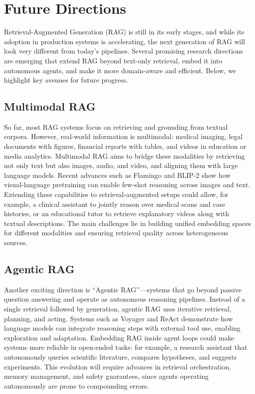 \documentclass[conference]{IEEEtran}
\begin{document}
\section{Future Directions}

Retrieval-Augmented Generation (RAG) is still in its early stages, and while its adoption in production systems is accelerating, the next generation of RAG will look very different from today’s pipelines. Several promising research directions are emerging that extend RAG beyond text-only retrieval, embed it into autonomous agents, and make it more domain-aware and efficient. Below, we highlight key avenues for future progress.

\subsection{Multimodal RAG}
So far, most RAG systems focus on retrieving and grounding from textual corpora. However, real-world information is multimodal: medical imaging, legal documents with figures, financial reports with tables, and videos in education or media analytics. Multimodal RAG aims to bridge these modalities by retrieving not only text but also images, audio, and video, and aligning them with large language models. Recent advances such as Flamingo \cite{alayrac2022flamingo} and BLIP-2 \cite{li2023blip2} show how visual-language pretraining can enable few-shot reasoning across images and text. Extending these capabilities to retrieval-augmented setups could allow, for example, a clinical assistant to jointly reason over medical scans and case histories, or an educational tutor to retrieve explanatory videos along with textual descriptions. The main challenges lie in building unified embedding spaces for different modalities and ensuring retrieval quality across heterogeneous sources.

\subsection{Agentic RAG}
Another exciting direction is ``Agentic RAG’’—systems that go beyond passive question answering and operate as autonomous reasoning pipelines. Instead of a single retrieval followed by generation, agentic RAG uses iterative retrieval, planning, and acting. Systems such as Voyager \cite{wang2023voyager} and ReAct \cite{yao2022react} demonstrate how language models can integrate reasoning steps with external tool use, enabling exploration and adaptation. Embedding RAG inside agent loops could make systems more reliable in open-ended tasks: for example, a research assistant that autonomously queries scientific literature, compares hypotheses, and suggests experiments. This evolution will require advances in retrieval orchestration, memory management, and safety guarantees, since agents operating autonomously are prone to compounding errors.
\end{document}
